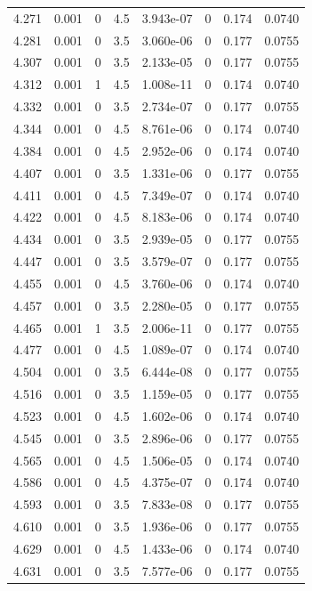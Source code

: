 \documentclass[preview]{standalone}
\begin{document}
{{{{{{{{{\begin{tabular}{L{1.2cm}C{1.2cm} C{0.3cm}C{0.5cm} C{1.4cm}C{1.4cm} C{1.4cm}C{1.4cm}}
  4.271  &  0.001  & 0     & 4.5 &  3.943e-07  & 0  & 0.174 &  0.0740   \\ 
  4.281  &  0.001  & 0     & 3.5 &  3.060e-06  & 0  & 0.177 &  0.0755   \\ 
  4.307  &  0.001  & 0     & 3.5 &  2.133e-05  & 0  & 0.177 &  0.0755   \\ 
  4.312  &  0.001  & 1     & 4.5 &  1.008e-11  & 0  & 0.174 &  0.0740   \\ 
  4.332  &  0.001  & 0     & 3.5 &  2.734e-07  & 0  & 0.177 &  0.0755   \\ 
  4.344  &  0.001  & 0     & 4.5 &  8.761e-06  & 0  & 0.174 &  0.0740   \\ 
  4.384  &  0.001  & 0     & 4.5 &  2.952e-06  & 0  & 0.174 &  0.0740   \\ 
  4.407  &  0.001  & 0     & 3.5 &  1.331e-06  & 0  & 0.177 &  0.0755   \\ 
  4.411  &  0.001  & 0     & 4.5 &  7.349e-07  & 0  & 0.174 &  0.0740   \\ 
  4.422  &  0.001  & 0     & 4.5 &  8.183e-06  & 0  & 0.174 &  0.0740   \\ 
  4.434  &  0.001  & 0     & 3.5 &  2.939e-05  & 0  & 0.177 &  0.0755   \\ 
  4.447  &  0.001  & 0     & 3.5 &  3.579e-07  & 0  & 0.177 &  0.0755   \\ 
  4.455  &  0.001  & 0     & 4.5 &  3.760e-06  & 0  & 0.174 &  0.0740   \\ 
  4.457  &  0.001  & 0     & 3.5 &  2.280e-05  & 0  & 0.177 &  0.0755   \\ 
  4.465  &  0.001  & 1     & 3.5 &  2.006e-11  & 0  & 0.177 &  0.0755   \\ 
  4.477  &  0.001  & 0     & 4.5 &  1.089e-07  & 0  & 0.174 &  0.0740   \\ 
  4.504  &  0.001  & 0     & 3.5 &  6.444e-08  & 0  & 0.177 &  0.0755   \\ 
  4.516  &  0.001  & 0     & 3.5 &  1.159e-05  & 0  & 0.177 &  0.0755   \\ 
  4.523  &  0.001  & 0     & 4.5 &  1.602e-06  & 0  & 0.174 &  0.0740   \\ 
  4.545  &  0.001  & 0     & 3.5 &  2.896e-06  & 0  & 0.177 &  0.0755   \\ 
  4.565  &  0.001  & 0     & 4.5 &  1.506e-05  & 0  & 0.174 &  0.0740   \\ 
  4.586  &  0.001  & 0     & 4.5 &  4.375e-07  & 0  & 0.174 &  0.0740   \\ 
  4.593  &  0.001  & 0     & 3.5 &  7.833e-08  & 0  & 0.177 &  0.0755   \\ 
  4.610  &  0.001  & 0     & 3.5 &  1.936e-06  & 0  & 0.177 &  0.0755   \\ 
  4.629  &  0.001  & 0     & 4.5 &  1.433e-06  & 0  & 0.174 &  0.0740   \\ 
  4.631  &  0.001  & 0     & 3.5 &  7.577e-06  & 0  & 0.177 &  0.0755   \\ 
\hline 
\end{tabular} 

}}}}}}}}}
\end{document}
